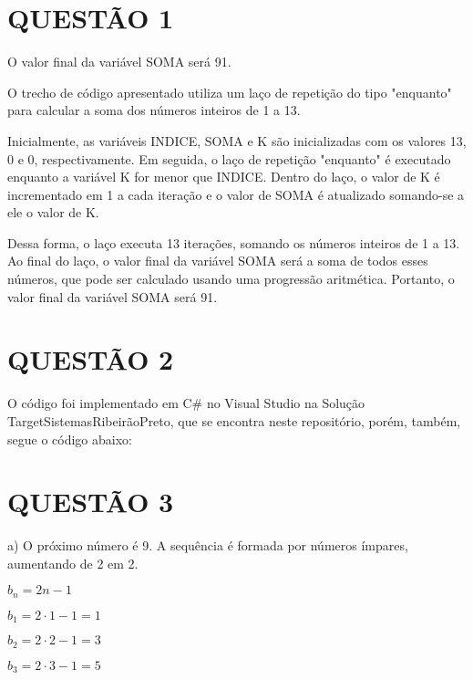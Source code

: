 \documentclass{assignment}
\begin{document}

\section*{QUESTÃO 1}

O valor final da variável SOMA será 91.

O trecho de código apresentado utiliza um laço de repetição do tipo "enquanto" para calcular a soma dos números inteiros de 1 a 13.

Inicialmente, as variáveis INDICE, SOMA e K são inicializadas com os valores 13, 0 e 0, respectivamente. Em seguida, o laço de repetição "enquanto" é executado enquanto a variável K for menor que INDICE. Dentro do laço, o valor de K é incrementado em 1 a cada iteração e o valor de SOMA é atualizado somando-se a ele o valor de K.

Dessa forma, o laço executa 13 iterações, somando os números inteiros de 1 a 13. Ao final do laço, o valor final da variável SOMA será a soma de todos esses números, que pode ser calculado usando uma progressão aritmética. Portanto, o valor final da variável SOMA será 91.

\section*{QUESTÃO 2}

O código foi implementado em C\# no Visual Studio na Solução TargetSistemasRibeirãoPreto, que se encontra neste repositório, porém, também, segue o código abaixo:
\\



\section*{QUESTÃO 3}

a) O próximo número é 9. A sequência é formada por números ímpares, aumentando de 2 em 2.
\newline

$b_n = 2n - 1$

$b_1 = 2\cdot1 - 1 = 1$

$b_2 = 2\cdot2 - 1 = 3$

$b_3 = 2\cdot3 - 1 = 5$
\end{document}
